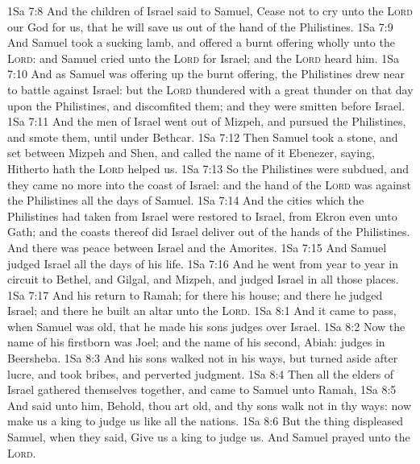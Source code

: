\vs 1Sa 7:8 And the children of Israel said to Samuel, Cease not to cry unto the \textsc{Lord} our God for us, that he will save us out of the hand of the Philistines.
\vs 1Sa 7:9 And Samuel took a sucking lamb, and offered  a burnt offering wholly unto the \textsc{Lord}: and Samuel cried unto the \textsc{Lord} for Israel; and the \textsc{Lord} heard him.
\vs 1Sa 7:10 And as Samuel was offering up the burnt offering, the Philistines drew near to battle against Israel: but the \textsc{Lord} thundered with a great thunder on that day upon the Philistines, and discomfited them; and they were smitten before Israel.
\vs 1Sa 7:11 And the men of Israel went out of Mizpeh, and pursued the Philistines, and smote them, until  under Bethcar.
\vs 1Sa 7:12 Then Samuel took a stone, and set  between Mizpeh and Shen, and called the name of it Ebenezer, saying, Hitherto hath the \textsc{Lord} helped us.
\vs 1Sa 7:13 So the Philistines were subdued, and they came no more into the coast of Israel: and the hand of the \textsc{Lord} was against the Philistines all the days of Samuel.
\vs 1Sa 7:14 And the cities which the Philistines had taken from Israel were restored to Israel, from Ekron even unto Gath; and the coasts thereof did Israel deliver out of the hands of the Philistines. And there was peace between Israel and the Amorites.
\vs 1Sa 7:15 And Samuel judged Israel all the days of his life.
\vs 1Sa 7:16 And he went from year to year in circuit to Bethel, and Gilgal, and Mizpeh, and judged Israel in all those places.
\vs 1Sa 7:17 And his return  to Ramah; for there  his house; and there he judged Israel; and there he built an altar unto the \textsc{Lord}.
\vs 1Sa 8:1 And it came to pass, when Samuel was old, that he made his sons judges over Israel.
\vs 1Sa 8:2 Now the name of his firstborn was Joel; and the name of his second, Abiah:  judges in Beersheba.
\vs 1Sa 8:3 And his sons walked not in his ways, but turned aside after lucre, and took bribes, and perverted judgment.
\vs 1Sa 8:4 Then all the elders of Israel gathered themselves together, and came to Samuel unto Ramah,
\vs 1Sa 8:5 And said unto him, Behold, thou art old, and thy sons walk not in thy ways: now make us a king to judge us like all the nations.
\vs 1Sa 8:6 But the thing displeased Samuel, when they said, Give us a king to judge us. And Samuel prayed unto the \textsc{Lord}.
